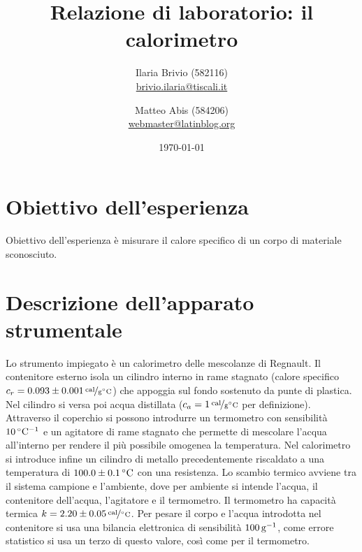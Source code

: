 \documentclass[italian,a4paper]{article}
\begin{document}
\title{Relazione di laboratorio: il calorimetro}
\author{\normalsize Ilaria Brivio (582116)\\%
\normalsize \url{brivio.ilaria@tiscali.it}%
\and %
\normalsize Matteo Abis (584206)\\ %
\normalsize \url{webmaster@latinblog.org}}
\date{\today}
\maketitle
\section{Obiettivo dell'esperienza}
Obiettivo dell'esperienza è misurare il calore specifico di un corpo di materiale sconosciuto.
\section{Descrizione dell'apparato strumentale}
Lo strumento impiegato è un calorimetro delle mescolanze di Regnault. Il contenitore esterno isola un cilindro interno in rame stagnato (calore specifico $c_r = \unitfrac[0.093\pm0.001]{cal}{g\celsius}$) che appoggia sul fondo sostenuto da punte di plastica. Nel cilindro si versa poi acqua distillata ($c_a = \unitfrac[1]{cal}{g\celsius}$ per definizione). Attraverso il coperchio si possono introdurre un termometro con sensibilità $\unit[10]{\celsius^{-1}}$ e un agitatore di rame stagnato che permette di mescolare l'acqua all'interno per rendere il più possibile omogenea la temperatura. Nel calorimetro si introduce infine un cilindro di metallo precedentemente riscaldato a una temperatura  di $\unit[100.0\pm0.1]{\celsius}$ con una resistenza. Lo scambio termico avviene tra il sistema campione e l'ambiente, dove per ambiente si intende l'acqua, il contenitore dell'acqua, l'agitatore e il termometro. Il termometro ha capacità termica $k=\unitfrac[2.20\pm0.05]{cal}{\celsius}$. Per pesare il corpo e l'acqua introdotta nel contenitore si usa una bilancia elettronica di sensibilità $\unit[100]{g^{-1}}$, come errore statistico si usa un terzo di questo valore, così come per il termometro.
\end{document}
